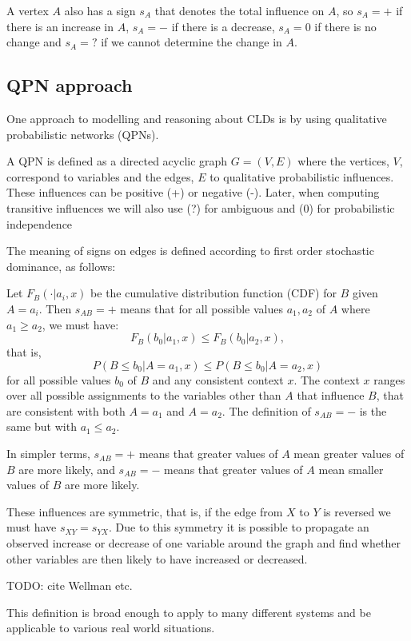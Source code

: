 \documentclass[]{article}
\begin{document}
A vertex $A$ also has a sign $s_A$ that denotes the total influence on $A$, so
$s_A=+$ if there is an increase in $A$, $s_A=-$ if there is a decrease, $s_A=0$
if there is no change and $s_A=?$ if we cannot determine the change in $A$.

\subsection{QPN approach}

One approach to modelling and reasoning about CLDs is by using qualitative
probabilistic networks (QPNs).

A QPN is defined as a directed
acyclic graph $G=(V,E)$ where the vertices, $V$, correspond to
variables and the edges, $E$ to qualitative probabilistic influences.
%
These influences can be positive (+) or negative (-).
%
Later, when computing transitive influences we will also use (?) for
ambiguous and (0) for probabilistic independence

The meaning of signs on edges is defined according to first order
stochastic dominance, as follows:

Let $F_B(\cdot|a_i, x)$ be the cumulative distribution function (CDF) for
$B$ given $A=a_i$. Then $s_{AB}=+$ means that for all possible values
$a_1,a_2$ of $A$ where $a_1\geq a_2$, we must have:
\[F_B(b_0|a_1, x)\leq F_B(b_0|a_2, x),\]
that is,
\[P(B \leq b_0| A = a_1, x)\leq P(B\leq b_0| A = a_2, x)\]
for all possible values $b_0$ of $B$ and any consistent context $x$.
The context $x$ ranges over all possible assignments to the
variables other than $A$ that influence $B$, that are consistent with both
$A=a_1$ and $A=a_2$.
%
The definition of $s_{AB}=-$ is the same but with $a_1\leq a_2$.

In simpler terms, $s_{AB} = +$ means that greater values of $A$ mean
greater values of $B$ are more likely, and $s_{AB}=-$ means that
greater values of $A$ mean smaller values of $B$ are more likely.

These influences are symmetric, that is, if the edge from $X$ to $Y$ is reversed
we must have $s_{XY} = s_{YX}$.
%
Due to this symmetry it is possible to propagate an observed increase
or decrease of one variable around the graph and find whether other
variables are then likely to have increased or decreased.

TODO: cite Wellman etc.

This definition is broad enough to
apply to many different systems and
be applicable to various real world situations.
\end{document}
